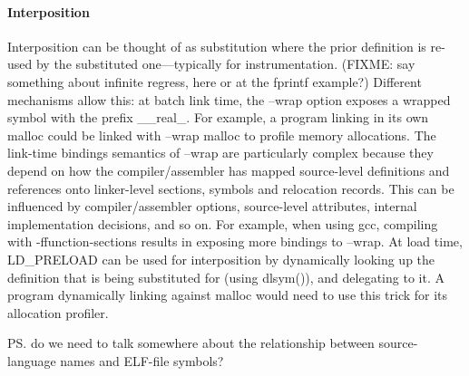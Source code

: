 \paragraph{Interposition}
Interposition can be thought of as substitution where the prior definition
is re-used by the substituted one---typically for instrumentation.
(FIXME: say something about infinite regress, here or at the fprintf example?)
Different mechanisms allow this:
at batch link time, the \textsf{--wrap} option exposes a wrapped symbol
with the prefix \textsf{\_\_real\_}.
For example, a program linking in its own \textsf{malloc} 
could be linked with \textsf{--wrap} \textsf{malloc} to profile memory allocations.
The link-time bindings semantics of \textsf{--wrap} are particularly complex because they depend on how the compiler/assembler has mapped source-level definitions and references onto linker-level sections, symbols and relocation records.
This can be influenced by compiler/assembler options, 
source-level attributes, internal implementation decisions, and so on.
For example, when using \textsf{gcc}, compiling with \textsf{-ffunction-sections} results in exposing more bindings to \textsf{--wrap}.
At load time, \textsf{LD\_PRELOAD} can be used for interposition by dynamically looking up the definition that is being substituted for (using \textsf{dlsym()}), and delegating to it. A program dynamically linking against \textsf{malloc} would need to use this trick for its allocation profiler. 



\ps{do we need to talk somewhere about the relationship between
  source-language names and ELF-file symbols?}

